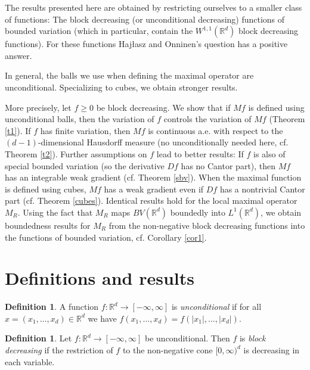 \documentclass[12pt]{amsart}
\numberwithin{equation}{section}
\theoremstyle{plain}
\theoremstyle{definition}
\newtheorem{definition}[theorem]{Definition}
\theoremstyle{remark}
\begin{document}
The results presented here are
obtained by restricting ourselves to a smaller class of functions:
The block decreasing (or unconditional decreasing) functions of bounded
variation (which in particular, contain the $W^{1,1}(\mathbb{R}^d)$
block decreasing functions). For these functions Haj\l asz and Onninen's question has a positive answer.

In general, the balls we use when defining the
maximal operator are unconditional.  Specializing to cubes,
we obtain stronger results.

More precisely, let  $f\ge 0$ be block decreasing. We show that  if $Mf$
is defined using unconditional balls, then
 the variation of $f$ controls the variation of $Mf$ (Theorem \ref{t1}).
If $f$ has finite variation, then $Mf$ is continuous a.e.
with respect to the $(d-1)$-dimensional Hausdorff measure
(no unconditionally needed here, cf. Theorem \ref{t2}). Further assumptions on $f$ lead to better results: If $f$ is also of
special bounded variation (so the derivative $Df$ has no Cantor part),
then $Mf$ has an integrable  weak gradient (cf. Theorem \ref{sbv}).
When the maximal function is defined using cubes, $Mf$ has a weak gradient
even if $Df$ has a nontrivial Cantor part (cf. Theorem \ref{cubes}). Identical results hold for the local maximal operator
$M_R$. Using the fact that  $M_R$  maps  $BV(\mathbb{R}^d)$ boundedly
into $L^1(\mathbb{R}^d)$, we obtain boundedness results for $M_R$
from the non-negative block decreasing functions into the functions of bounded
variation, cf. Corollary \ref{cor1}.

\section{Definitions and results}

\begin{definition}  A function $f : \mathbb{R}^d\to [-\infty, \infty]$ is
{\em unconditional} if  for all $x = (x_1,\dots, x_d)\in \mathbb{R}^d$ we have $f(x_1,\ldots,x_d)=f(|x_1|,\ldots,|x_d|)$.
\end{definition}

\begin{definition} Let $f : \mathbb{R}^d\to [-\infty, \infty]$ be unconditional. Then $f$
is {\em block decreasing} if  the restriction of
$f$  to the non-negative cone $[0,\infty)^d$  is decreasing in each variable.
\end{definition}
\end{document}
